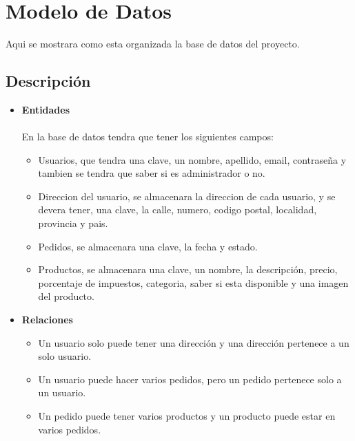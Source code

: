 \documentclass{article}
\begin{document}
\section{Modelo de Datos}
\quad Aqui se mostrara como esta organizada la base de datos del proyecto.
\subsection{Descripción}
\begin{itemize}
    \item \textbf{Entidades} \\\\
En la base de datos tendra que tener los siguientes campos:
\begin{itemize}
    \item Usuarios, que tendra una clave, un nombre, apellido, email, contraseña y tambien se tendra que saber si es administrador o no.
    \item Direccion del usuario, se almacenara la direccion de cada usuario, y se devera tener, una clave, la calle, numero, codigo postal, localidad, provincia y pais.
    \item Pedidos, se almacenara una clave, la fecha y estado. 
    \item Productos, se almacenara una clave, un nombre, la descripción, precio, porcentaje de impuestos, categoria, saber si esta disponible y una imagen del producto.
\end{itemize}
\item \textbf{Relaciones} 
\begin{itemize}
    \item Un usuario solo puede tener una dirección y una dirección pertenece a un solo usuario. 
    \item Un usuario puede hacer varios pedidos, pero un pedido pertenece solo a un usuario.
    \item Un pedido puede tener varios productos y un producto puede estar en varios pedidos.
\end{itemize}
\end{itemize}
\end{document}
